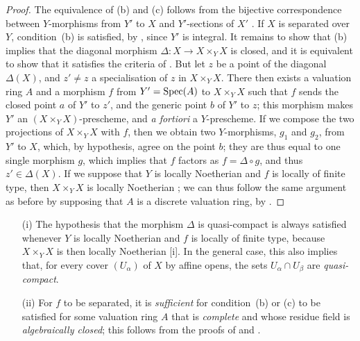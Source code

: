 \begin{proof}
\label{proof-II.7.2.3}
The equivalence of (b) and (c) follows from the bijective correspondence between $Y$-morphisms from $Y'$ to $X$ and $Y'$-sections of $X'$ .
If $X$ is separated over $Y$, condition~(b) is satisfied, by , since $Y'$ is integral.
It remains to show that (b) implies that the diagonal morphism $\Delta:X\to X\times_Y X$ is closed, and it is equivalent to show that it satisfies the criteria of .
But let $z$ be a point of the diagonal $\Delta(X)$, and $z'\neq z$ a specialisation of $z$ in $X\times_Y X$.
There then exists  a valuation ring $A$ and a morphism $f$ from $Y'=\operatorname{Spec}(A)$ to $X\times_Y X$ such that $f$ sends the closed point $a$ of $Y'$ to $z'$, and the generic point $b$ of $Y'$ to $z$;
this morphism makes $Y'$ an $(X\times_Y X)$-prescheme, and \emph{a fortiori} a $Y$-prescheme.
If we compose the two projections of $X\times_Y X$ with $f$, then we obtain two $Y$-morphisms, $g_1$ and $g_2$, from $Y'$ to $X$, which, by hypothesis, agree on the point $b$;
they are thus equal to one single morphism $g$, which implies  that $f$ factors as $f=\Delta\circ g$, and thus $z'\in\Delta(X)$.
If we suppose that $Y$ is locally Noetherian and $f$ is locally of finite type, then $X\times_Y X$ is locally Noetherian ;
we can thus follow the same argument as before by supposing that $A$ is a discrete valuation ring, by .
\end{proof}

\begin{remark}[7.2.4]
\label{II.7.2.4}
\begin{enumerate}
    \item[\rm{(i)}] The hypothesis that the morphism $\Delta$ is quasi-compact is always satisfied whenever $Y$ is locally Noetherian and $f$ is locally of finite type, because $X\times_Y X$ is then locally Noetherian [i].
        In the general case, this also implies that, for every cover $(U_\alpha)$ of $X$ by affine opens, the sets $U_\alpha\cap U_\beta$ are \emph{quasi-compact}.
    \item[\rm{(ii)}] For $f$ to be separated, it is \emph{sufficient} for condition~(b) or (c) to be satisfied for some valuation ring $A$ that is \emph{complete} and whose residue field is \emph{algebraically closed};
        this follows from the proofs of  and .
\end{enumerate}
\end{remark}


